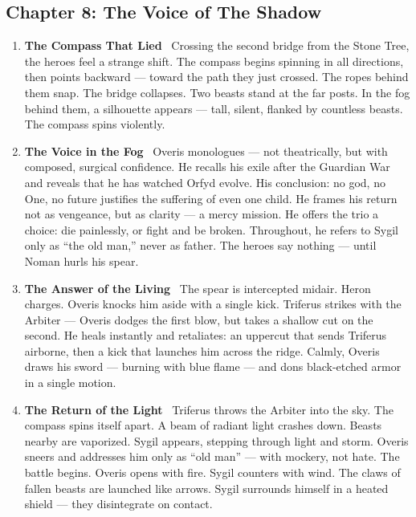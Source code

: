 \documentclass[9pt]{article}
\begin{document}
\newpage

\subsection*{Chapter 8: The Voice of The Shadow}

\vspace{1in}

\begin{center}
\begin{enumerate}

\item \textbf{The Compass That Lied} \
Crossing the second bridge from the Stone Tree, the heroes feel a strange shift. The compass begins spinning in all directions, then points backward — toward the path they just crossed. The ropes behind them snap. The bridge collapses. Two beasts stand at the far posts. In the fog behind them, a silhouette appears — tall, silent, flanked by countless beasts. The compass spins violently.

\vspace{.3in}

\item \textbf{The Voice in the Fog} \
Overis monologues — not theatrically, but with composed, surgical confidence. He recalls his exile after the Guardian War and reveals that he has watched Orfyd evolve. His conclusion: no god, no One, no future justifies the suffering of even one child. He frames his return not as vengeance, but as clarity — a mercy mission. He offers the trio a choice: die painlessly, or fight and be broken. Throughout, he refers to Sygil only as “the old man,” never as father. The heroes say nothing — until Noman hurls his spear.

\vspace{.3in}

\item \textbf{The Answer of the Living} \
The spear is intercepted midair. Heron charges. Overis knocks him aside with a single kick. Triferus strikes with the Arbiter — Overis dodges the first blow, but takes a shallow cut on the second. He heals instantly and retaliates: an uppercut that sends Triferus airborne, then a kick that launches him across the ridge. Calmly, Overis draws his sword — burning with blue flame — and dons black-etched armor in a single motion.

\vspace{.3in}

\item \textbf{The Return of the Light} \
Triferus throws the Arbiter into the sky. The compass spins itself apart. A beam of radiant light crashes down. Beasts nearby are vaporized. Sygil appears, stepping through light and storm. Overis sneers and addresses him only as “old man” — with mockery, not hate. The battle begins. Overis opens with fire. Sygil counters with wind. The claws of fallen beasts are launched like arrows. Sygil surrounds himself in a heated shield — they disintegrate on contact.


\end{enumerate}
\end{center}
\end{document}
